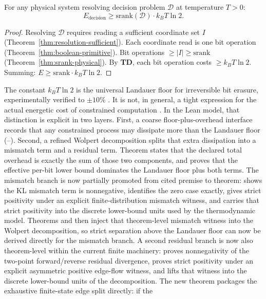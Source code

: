 \begin{theorem}\label{thm:thermo-derived}
For any physical system resolving decision problem $\mathcal{D}$ at temperature $T > 0$:
\[
E_{\mathrm{decision}} \geq \mathrm{srank}(\mathcal{D}) \cdot k_B T \ln 2.
\]
\begin{proof}
Resolving $\mathcal{D}$ requires reading a sufficient coordinate set $I$
(Theorem~\ref{thm:resolution-sufficient}). Each coordinate read is one bit
operation (Theorem~\ref{thm:boolean-primitive}). Bit operations $\geq |I| \geq \mathrm{srank}$
(Theorem~\ref{thm:srank-physical}). By \textbf{TD}, each bit operation costs
$\geq k_B T \ln 2$. Summing: $E \geq \mathrm{srank} \cdot k_B T \ln 2$.
\end{proof}
The constant $k_B T \ln 2$ is the universal Landauer floor for irreversible
bit erasure, experimentally verified to $\pm 10\%$
\cite{berut2012experimental}. It is not, in general, a tight expression for the
actual energetic cost of constrained computation
\cite{wolpert2024stochastic,manzano2024absolute,yadav2026minimal}. In the Lean
model, that distinction is explicit in two layers. First, a coarse
floor-plus-overhead interface records that any constrained process may dissipate
more than the Landauer floor (--). Second, a refined Wolpert
decomposition splits that extra dissipation into a mismatch term and a residual
term. Theorem  states that the declared total overhead is exactly the
sum of those two components, and  proves that the effective per-bit
lower bound dominates the Landauer floor plus both terms. The mismatch branch
is now partially promoted from cited premise to theorem:  shows the
KL mismatch term is nonnegative,  identifies the zero case exactly,
 gives strict positivity under an explicit finite-distribution mismatch
witness, and  carries that strict positivity into the discrete lower-bound
units used by the thermodynamic model. Theorems  and  then
inject that theorem-level mismatch witness into the Wolpert decomposition, so
strict separation above the Landauer floor can now be derived directly for the
mismatch branch. A second residual branch is now also theorem-level within the
current finite machinery:  proves nonnegativity of the two-point
forward/reverse residual divergence,  proves strict positivity under an
explicit asymmetric positive edge-flow witness, and  lifts that witness
into the discrete lower-bound units of the decomposition. The new theorem
 packages the exhaustive finite-state edge split directly: if the

\end{theorem}
